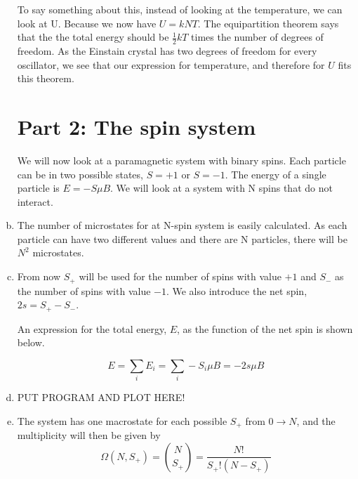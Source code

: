 \documentclass[a4paper,norsk,12pt,oneside]{article}
\begin{document}
\begin{enumerate}[a)]
        To say something about this, instead of looking at the temperature, we can look
        at U. Because we now have \(U = kNT\). The equipartition theorem says that the 
        the total energy should be \(\frac{1}{2}kT\) times the number of degrees of freedom. 
        As the Einstain crystal has two degrees of freedom for every oscillator, we see
        that our expression for temperature, and therefore for \(U\) fits this theorem. 

\section{Part 2: The spin system}


        We will now look at a paramagnetic system with binary spins. Each particle can
        be in two possible states, \(S = +1\) or \(S = -1\). The energy of a single particle
        is \(E = -S\mu B\). We will look at a system with N spins that do not interact. 

    \item

        The number of microstates for at N-spin system is easily calculated. As each 
        particle can have two different values and there are N particles, there will be 
        \(N^2\) microstates. 

    \item

        From now \(S_+\) will be used for the number of spins with value \(+1\) and \(S_-\) 
        as the number of spins with value \(-1\). We also introduce the net spin, \(2s = 
        S_+ - S_-\).

        An expression for the total energy, \(E\), as the function of the net spin
        is shown below. 

        \begin{equation*}
            E = \sum\limits_i E_i = \sum\limits_i -S_i \mu B = -2s \mu B
        \end{equation*}

    \item

        PUT PROGRAM AND PLOT HERE! 

    \item

        The system has one macrostate for each possible \(S_+\) from \(0 \rightarrow N\),
        and the multiplicity will then be given by
        \begin{equation*}
            \Omega(N, S_+) = \binom{N}{S_+} = \frac{N!}{S_+!(N-S_+)}
        \end{equation*}


\end{enumerate}
\end{document}
